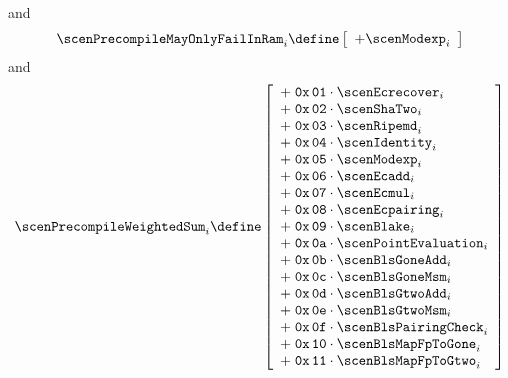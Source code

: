 and
\[
	\scenPrecompileMayOnlyFailInRam _{i}
	\define
	\left[ \begin{array}{l}
		+ \scenModexp          _{i} \\
	\end{array} \right]
\]
and
\[
	\scenPrecompileWeightedSum _{i}
	\define
	\left[ \begin{array}{l}
		+ \; \mathtt{0x\,01} \cdot \scenEcrecover       _{i} \\
		+ \; \mathtt{0x\,02} \cdot \scenShaTwo          _{i} \\
		+ \; \mathtt{0x\,03} \cdot \scenRipemd          _{i} \\
		+ \; \mathtt{0x\,04} \cdot \scenIdentity        _{i} \\
		+ \; \mathtt{0x\,05} \cdot \scenModexp          _{i} \\
		+ \; \mathtt{0x\,06} \cdot \scenEcadd           _{i} \\
		+ \; \mathtt{0x\,07} \cdot \scenEcmul           _{i} \\
		+ \; \mathtt{0x\,08} \cdot \scenEcpairing       _{i} \\
		+ \; \mathtt{0x\,09} \cdot \scenBlake           _{i} \\
		+ \; \mathtt{0x\,0a} \cdot \scenPointEvaluation _{i} \\
		+ \; \mathtt{0x\,0b} \cdot \scenBlsGoneAdd      _{i} \\
		+ \; \mathtt{0x\,0c} \cdot \scenBlsGoneMsm      _{i} \\
		+ \; \mathtt{0x\,0d} \cdot \scenBlsGtwoAdd      _{i} \\
		+ \; \mathtt{0x\,0e} \cdot \scenBlsGtwoMsm      _{i} \\
		+ \; \mathtt{0x\,0f} \cdot \scenBlsPairingCheck _{i} \\
		+ \; \mathtt{0x\,10} \cdot \scenBlsMapFpToGone  _{i} \\
		+ \; \mathtt{0x\,11} \cdot \scenBlsMapFpToGtwo  _{i} \\
	\end{array} \right]
\]
